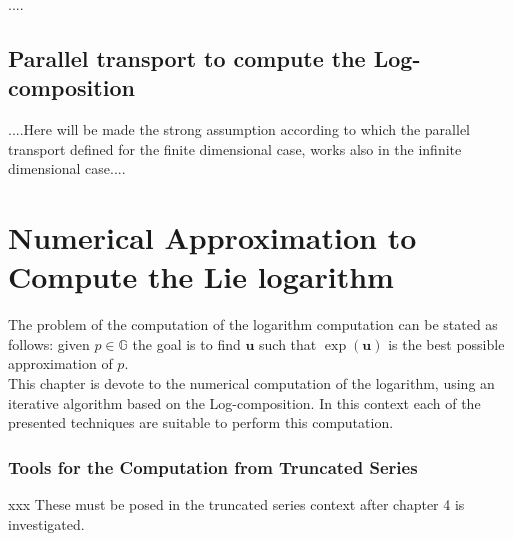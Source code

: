 ....


\subsection{Parallel transport to compute the Log-composition}

....Here will be made the strong assumption according to which the parallel transport defined for the finite dimensional case, works also in the infinite dimensional case....



\section{Numerical Approximation to Compute the Lie logarithm}\label{ch:lie_log_computation}

The problem of the computation of the logarithm computation can be stated as follows:
given $p \in \mathbb{G}$ the goal is to find $\mathbf{u}$ such that $\exp(\mathbf{u})$ is the best possible approximation of $p$.  \\
This chapter is devote to the numerical computation of the logarithm, using an iterative algorithm based on the Log-composition. In this context each of the presented techniques are suitable to perform this computation.


\subsubsection{Tools for the Computation from Truncated Series}

\noindent
xxx These must be posed in the truncated series context after chapter 4 is investigated.\\

